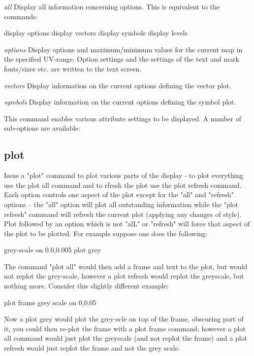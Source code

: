 {\em all}
\newline
Display all information concerning options. This is equivalent
to the commands:

                   display options
                   display vectors
                   display symbols
                   display levels

{\em options}
\newline
Display options and maximum/minimum values for the current map
in the specified UV-range. Option settings and the settings of
the text and mark fonts/sizes etc. are written to the text
screen.

{\em vectors}
\newline
Display information on the current options defining the vector
plot.

{\em symbols}
\newline
Display information on the current options defining the symbol
plot.

This command enables various attribute settings to be displayed.
A number of sub-options are available:


\subsection{plot}

Issue a "plot" command to plot various parts of the display - to plot
everything use the plot all command and to rfresh the plot use the
plot refresh command.  Each option controls one aspect of the plot
except for the "all" and "refresh" options -- the "all" option will
plot all outstanding information while the "plot refresh" command
will refresh the current plot (applying any changes of style).
Plot followed by an option which is not "alL" or "refresh" will force
that aspect of the plot to be plotted.  For example suppose one does the
following:

   grey-scale on 0.0,0.005
   plot grey

The command "plot all" would then add a frame and text to the plot, but
would not replot the grey-scale, however a plot refresh would replot
the greyscale, but nothing more.  Consider this slightly different
example:

   plot frame
   grey scale on 0,0.05

Now a plot grey would plot the grey-scle on top of the frame,
obscuring part of it, you could then re-plot the frame with a
plot frame command; however a plot all command would just plot the
greyscale (and not replot the frame) and a plot refresh would just
replot the frame and not the grey scale.

